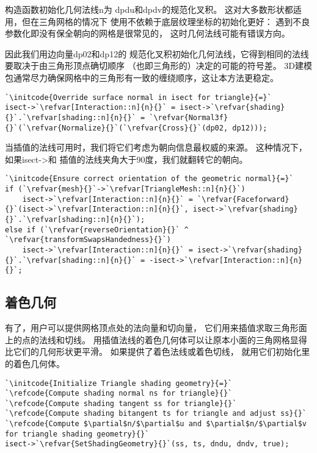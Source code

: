 构造函数初始化几何法线{\ttfamily n}为
{\ttfamily dpdu}和{\ttfamily dpdv}的规范化叉积。
这对大多数形状都适用，但在三角网格的情况下
使用不依赖于底层纹理坐标的初始化更好：
遇到不良参数化即没有保全朝向的网格是很常见的，
这时几何法线可能有错误方向。

因此我们用边向量{\ttfamily dp02}和{\ttfamily dp12}的
规范化叉积初始化几何法线，它得到相同的法线要取决于由三角形顶点确切顺序
（也即三角形的）决定的可能的符号差。
3D建模包通常尽力确保网格中的三角形有一致的缠绕顺序，这让本方法更稳定。
\begin{lstlisting}
`\initcode{Override surface normal in isect for triangle}{=}`
isect->`\refvar[Interaction::n]{n}{}` = isect->`\refvar{shading}{}`.`\refvar[shading::n]{n}{}` = `\refvar{Normal3f}{}`(`\refvar{Normalize}{}`(`\refvar{Cross}{}`(dp02, dp12)));
\end{lstlisting}

当插值的法线可用时，我们将它们考虑为朝向信息最权威的来源。
这种情况下，如果{\ttfamily isect->}和
插值的法线夹角大于90度，我们就翻转它的朝向。
\begin{lstlisting}
`\initcode{Ensure correct orientation of the geometric normal}{=}`
if (`\refvar{mesh}{}`->`\refvar[TriangleMesh::n]{n}{}`)
    isect->`\refvar[Interaction::n]{n}{}` = `\refvar{Faceforward}{}`(isect->`\refvar[Interaction::n]{n}{}`, isect->`\refvar{shading}{}`.`\refvar[shading::n]{n}{}`);
else if (`\refvar{reverseOrientation}{}` ^ `\refvar{transformSwapsHandedness}{}`)
    isect->`\refvar[Interaction::n]{n}{}` = isect->`\refvar{shading}{}`.`\refvar[shading::n]{n}{}` = -isect->`\refvar[Interaction::n]{n}{}`;  
\end{lstlisting}

\subsection{着色几何}\label{sub:着色几何}
有了，用户可以提供网格顶点处的法向量和切向量，
它们用来插值求取三角形面上的点的法线和切线。
用插值法线的着色几何体可以让原本小面的三角网格显得比它们的几何形状更平滑。
如果提供了着色法线或着色切线，
就用它们初始化里的着色几何体。
\begin{lstlisting}
`\initcode{Initialize Triangle shading geometry}{=}`
`\refcode{Compute shading normal ns for triangle}{}`
`\refcode{Compute shading tangent ss for triangle}{}`
`\refcode{Compute shading bitangent ts for triangle and adjust ss}{}`
`\refcode{Compute $\partial$n/$\partial$u and $\partial$n/$\partial$v for triangle shading geometry}{}`
isect->`\refvar{SetShadingGeometry}{}`(ss, ts, dndu, dndv, true);
\end{lstlisting}

